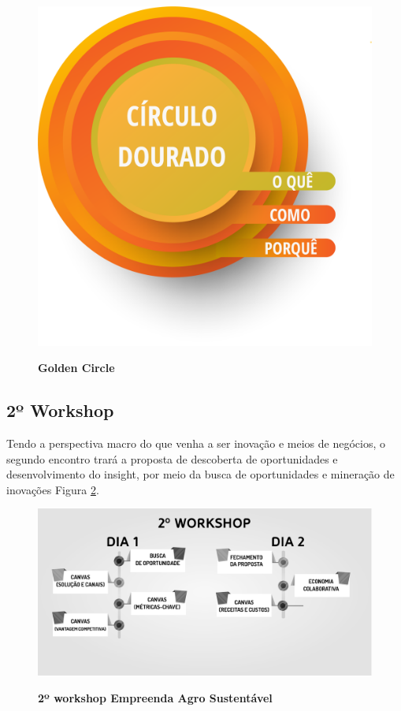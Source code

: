 \begin{figure}[!h]
\centering
\caption{\textbf{Golden Circle}}
\includegraphics[scale=0.3]{Imagens/circulo_dourado.png}
\label{figura_5}
\end{figure}
\newpage

\subsection{2º Workshop}

Tendo a perspectiva macro do que venha a ser inovação e meios de negócios, o segundo encontro trará a proposta de descoberta de oportunidades e desenvolvimento do insight, por meio da busca de oportunidades e mineração de inovações Figura \ref{figura_31}.


\begin{figure}[!h]
\centering
\caption{\textbf{2º workshop Empreenda Agro Sustentável}}
\includegraphics[scale=0.3]{Imagens/2_workshop.png}
\label{figura_31}
\end{figure}

